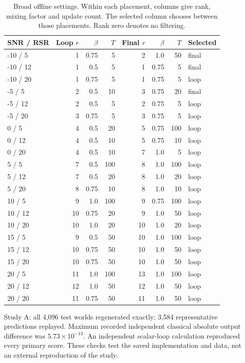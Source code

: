 \begin{table}[!t]
\caption{Broad offline settings. Within each placement, columns give rank, mixing factor and update count. The selected column chooses between those placements. Rank zero denotes no filtering.}
\label{tab:settings-broad}\centering\footnotesize
\setlength{\tabcolsep}{4pt}
\begin{tabular}{@{}lrrrrrrl@{}}\toprule
SNR / RSR & Loop $r$ & $\beta$ & $T$ & Final $r$ & $\beta$ & $T$ & Selected\\
\midrule
-10 / 5 & 1 & 0.75 & 5 & 2 & 1.0 & 50 & final\\
-10 / 12 & 1 & 0.5 & 5 & 1 & 0.75 & 5 & final\\
-10 / 20 & 1 & 0.75 & 5 & 1 & 0.75 & 5 & loop\\
-5 / 5 & 2 & 0.5 & 10 & 3 & 0.75 & 20 & final\\
-5 / 12 & 2 & 0.5 & 5 & 2 & 0.75 & 5 & loop\\
-5 / 20 & 3 & 0.75 & 5 & 3 & 0.75 & 5 & loop\\
0 / 5 & 4 & 0.5 & 20 & 5 & 0.75 & 100 & loop\\
0 / 12 & 4 & 0.5 & 10 & 5 & 0.75 & 10 & loop\\
0 / 20 & 4 & 0.5 & 10 & 7 & 1.0 & 5 & loop\\
5 / 5 & 7 & 0.5 & 100 & 8 & 1.0 & 100 & loop\\
5 / 12 & 7 & 0.5 & 20 & 8 & 1.0 & 20 & loop\\
5 / 20 & 8 & 0.75 & 10 & 8 & 1.0 & 10 & loop\\
10 / 5 & 9 & 1.0 & 100 & 9 & 0.75 & 100 & loop\\
10 / 12 & 10 & 0.75 & 20 & 9 & 1.0 & 50 & loop\\
10 / 20 & 10 & 1.0 & 20 & 10 & 1.0 & 20 & loop\\
15 / 5 & 9 & 0.5 & 50 & 10 & 1.0 & 100 & loop\\
15 / 12 & 10 & 0.75 & 50 & 10 & 1.0 & 50 & loop\\
15 / 20 & 10 & 0.75 & 50 & 10 & 1.0 & 50 & loop\\
20 / 5 & 11 & 1.0 & 100 & 13 & 1.0 & 100 & loop\\
20 / 12 & 12 & 1.0 & 50 & 12 & 1.0 & 50 & loop\\
20 / 20 & 11 & 0.75 & 50 & 11 & 1.0 & 50 & loop\\
\bottomrule
\end{tabular}
\end{table}


Study A: all 4,096 test worlds regenerated exactly; 3,584 representative predictions replayed. Maximum recorded independent classical absolute output difference was $5.73\times10^{-13}$. An independent scalar-loop calculation reproduced every primary score. These checks test the saved implementation and data, not an external reproduction of the study.

